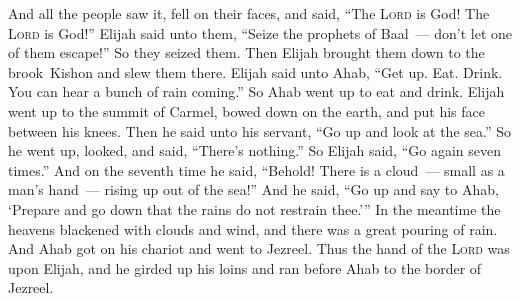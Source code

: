\begin{inparaenum}
     And all the people saw it, fell on their faces, and said, ``The \textsc{Lord} is God! The \textsc{Lord} is God!''%
     Elijah said unto them, ``Seize the prophets of Baal~--- don't let one of them escape!'' So they seized them. Then Elijah brought them down to the brook~Kishon and slew them there.%
     Elijah said unto Ahab, ``Get up. Eat. Drink. You can hear a bunch of rain coming.''%
     So Ahab went up to eat and drink. Elijah went up to the summit of Carmel, bowed down on the earth, and put his face between his knees.%
     Then he said unto his servant, ``Go up and look at the sea.'' So he went up, looked, and said, ``There's nothing.'' So Elijah said, ``Go again seven times.''%
     And on the seventh time he said, ``Behold! There is a cloud~--- small as a man's hand~--- rising up out of the sea!'' And he said, ``Go up and say to Ahab, `Prepare and go down that the rains do not restrain thee.'''%
     In the meantime the heavens blackened with clouds and wind, and there was a great pouring of rain. And Ahab got on his chariot and went to Jezreel.%
     Thus the hand of the \textsc{Lord} was upon Elijah, and he girded up his loins and ran before Ahab to the border of Jezreel.%
\end{inparaenum}
